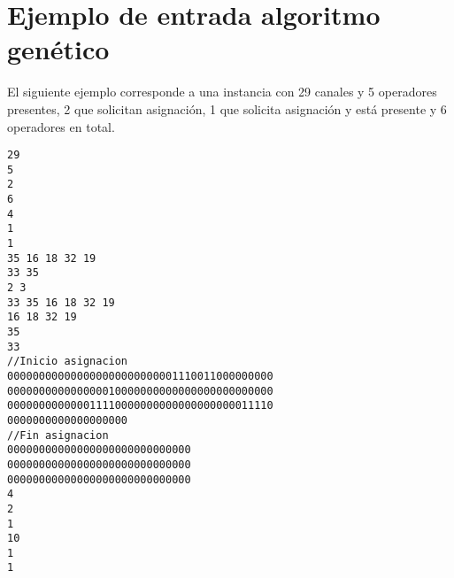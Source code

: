 \section*{Ejemplo de entrada algoritmo genético}  \label{anexo:inGenetico}


El siguiente ejemplo corresponde a una instancia con 29 canales y 5 operadores presentes, 2 que solicitan asignación, 1 que solicita asignación y está presente y 6 operadores en total.
\begin{lstlisting}[frame=tlRB]
29
5
2
6
4
1
1
35 16 18 32 19
33 35
2 3
33 35 16 18 32 19
16 18 32 19
35
33
//Inicio asignacion
000000000000000000000000001110011000000000
000000000000000010000000000000000000000000
000000000000011110000000000000000000011110
0000000000000000000 
//Fin asignacion
00000000000000000000000000000
00000000000000000000000000000
00000000000000000000000000000
4
2
1
10
1
1
\end{lstlisting}
